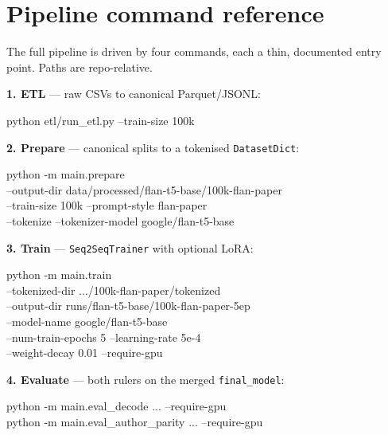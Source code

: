 \documentclass[11pt,twocolumn]{article}
\newcommand{\bt}[1]{\texttt{#1}}
\begin{document}
\appendix

\section{Pipeline command reference}
\label{app:cmd}
The full pipeline is driven by four commands, each a thin, documented entry point. Paths are
repo-relative.

\vspace{0.3em}
\noindent\textbf{1. ETL} --- raw CSVs to canonical Parquet/JSONL:
{\footnotesize\begin{flushleft}\ttfamily
python etl/run\_etl.py --train-size 100k
\end{flushleft}}

\noindent\textbf{2. Prepare} --- canonical splits to a tokenised \bt{DatasetDict}:
{\footnotesize\begin{flushleft}\ttfamily
python -m main.prepare \\
\hspace*{1em}--output-dir data/processed/flan-t5-base/100k-flan-paper \\
\hspace*{1em}--train-size 100k --prompt-style flan-paper \\
\hspace*{1em}--tokenize --tokenizer-model google/flan-t5-base
\end{flushleft}}

\noindent\textbf{3. Train} --- \bt{Seq2SeqTrainer} with optional LoRA:
{\footnotesize\begin{flushleft}\ttfamily
python -m main.train \\
\hspace*{1em}--tokenized-dir .../100k-flan-paper/tokenized \\
\hspace*{1em}--output-dir runs/flan-t5-base/100k-flan-paper-5ep \\
\hspace*{1em}--model-name google/flan-t5-base \\
\hspace*{1em}--num-train-epochs 5 --learning-rate 5e-4 \\
\hspace*{1em}--weight-decay 0.01 --require-gpu
\end{flushleft}}

\noindent\textbf{4. Evaluate} --- both rulers on the merged \bt{final\_model}:
{\footnotesize\begin{flushleft}\ttfamily
python -m main.eval\_decode ... --require-gpu \\
python -m main.eval\_author\_parity ... --require-gpu
\end{flushleft}}
\end{document}
